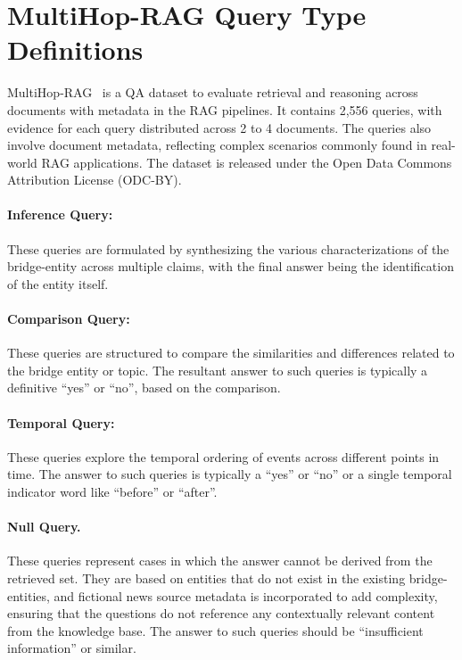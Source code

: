 \documentclass[11pt]{article}
\begin{document}
\section{MultiHop-RAG Query Type Definitions}
\label{app:query_types}

MultiHop-RAG~\citep{17} is a QA dataset to evaluate retrieval and reasoning across documents with metadata in the RAG pipelines. It contains 2{,}556 queries, with evidence for each query distributed across 2 to 4 documents. The queries also involve document metadata, reflecting complex scenarios commonly found in real-world RAG applications. The dataset is released under the Open Data Commons Attribution License (ODC-BY).

\paragraph{Inference Query:} These queries are formulated by synthesizing the various characterizations of the bridge-entity across multiple claims, with the final answer being the identification of the entity itself.

\paragraph{Comparison Query:} These queries are structured to compare the similarities and differences related to the bridge entity or topic. The resultant answer to such queries is typically a definitive ``yes'' or ``no'', based on the comparison.

\paragraph{Temporal Query:} These queries explore the temporal ordering of events across different points in time. The answer to such queries is typically a ``yes'' or ``no'' or a single temporal indicator word like ``before'' or ``after''.

\paragraph{Null Query.} These queries represent cases in which the answer cannot be derived from the retrieved set. They are based on entities that do not exist in the existing bridge-entities, and fictional news source metadata is incorporated to add complexity, ensuring that the questions do not reference any contextually relevant content from the knowledge base. The answer to such queries should be ``insufficient information'' or similar.
\end{document}
